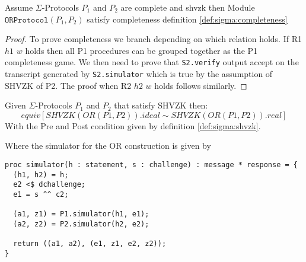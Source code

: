 \begin{lemma}[OR Completeness]
  Assume $\Sigma$-Protocols $P_{1}$ and $P_{2}$ are complete and shvzk then
  Module $\texttt{ORProtocol}(P_1, P_2)$ satisfy completeness definition \ref{def:sigma:completeness}
\end{lemma}
\begin{proof}
  To prove completeness we branch depending on which relation holds. If R1 $h1$
  $w$ holds then all P1 procedures can be grouped together as the P1
  completeness game. We then need to prove that \texttt{S2.verify} output accept
  on the transcript generated by \texttt{S2.simulator} which is true by the
  assumption of SHVZK of P2.
  The proof when R2 $h2$ $w$ holds follows similarly.
\end{proof}

\begin{lemma}[OR SHVZK]
  Given $\Sigma$-Protocols $P_{1}$ and $P_{2}$ that satisfy SHVZK then:
  \[
    equiv[SHVZK(OR(P1, P2)).ideal \sim SHVZK(OR(P1, P2)).real]
  \]
  With the Pre and Post condition given by definition \ref{def:sigma:shvzk}.

  Where the simulator for the OR construction is given by

\begin{lstlisting}
proc simulator(h : statement, s : challenge) : message * response = {
  (h1, h2) = h;
  e2 <$ dchallenge;
  e1 = s ^^ c2;

  (a1, z1) = P1.simulator(h1, e1);
  (a2, z2) = P2.simulator(h2, e2);

  return ((a1, a2), (e1, z1, e2, z2));
}
\end{lstlisting}
\end{lemma}
